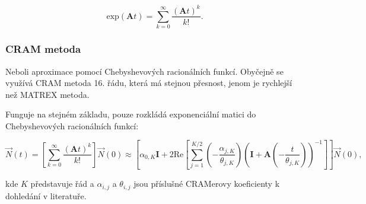 $$ \text{exp} (\textbf{A}t) = \sum_{k=0}^\infty \dfrac{(\textbf{A}t)^k}{k!}. $$

\subsubsection{CRAM metoda}

Neboli aproximace pomocí Chebyshevových racionálních funkcí. Obyčejně se využívá CRAM metoda 16. řádu, která má stejnou přesnost, jenom je rychlejší než MATREX metoda.

Funguje na stejném základu, pouze rozkládá exponenciální matici do Chebyshevových racionálních funkcí:

$$ \vec{N}(t) = \left [ \sum_{k=0}^\infty \dfrac{(\textbf{A}t)^k}{k!} \right ] \vec{N}(0) \approx \left [ \alpha_{0,K} \textbf{I} + 2 \text{Re} \left [ \sum_{j=1}^{K/2} \left ( -\dfrac{\alpha_{j,K}}{\theta_{j,K}} \right ) \left ( \textbf{I} + \textbf{A} \left ( -\dfrac{t}{\theta_{j,K}} \right ) \right ) ^{-1} \right ] \right ] \vec{N}(0), $$

kde $K$ představuje řád a $\alpha_{i,j}$ a $\theta_{i,j}$ jsou příslušné CRAMerovy koeficienty k dohledání v literatuře.